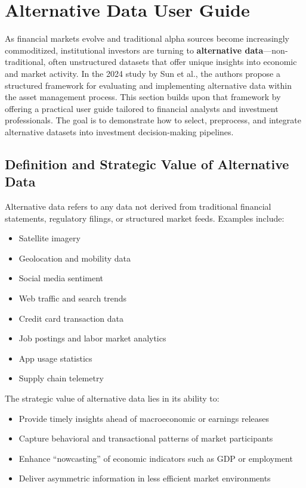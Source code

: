 \section{Alternative Data User Guide}

As financial markets evolve and traditional alpha sources become increasingly commoditized, institutional investors are turning to \textbf{alternative data}—non-traditional, often unstructured datasets that offer unique insights into economic and market activity. In the 2024 study by Sun et al., the authors propose a structured framework for evaluating and implementing alternative data within the asset management process. This section builds upon that framework by offering a practical user guide tailored to financial analysts and investment professionals. The goal is to demonstrate how to select, preprocess, and integrate alternative datasets into investment decision-making pipelines.

\subsection{Definition and Strategic Value of Alternative Data}

Alternative data refers to any data not derived from traditional financial statements, regulatory filings, or structured market feeds. Examples include:

\begin{itemize}
    \item Satellite imagery
    \item Geolocation and mobility data
    \item Social media sentiment
    \item Web traffic and search trends
    \item Credit card transaction data
    \item Job postings and labor market analytics
    \item App usage statistics
    \item Supply chain telemetry
\end{itemize}

The strategic value of alternative data lies in its ability to:

\begin{itemize}
    \item Provide timely insights ahead of macroeconomic or earnings releases
    \item Capture behavioral and transactional patterns of market participants
    \item Enhance ``nowcasting'' of economic indicators such as GDP or employment
    \item Deliver asymmetric information in less efficient market environments
\end{itemize}

